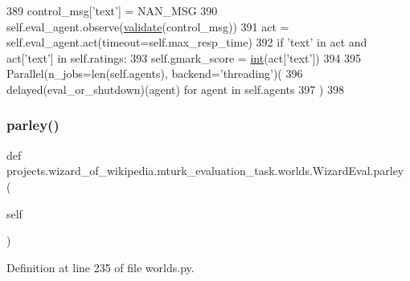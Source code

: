 \begin{DoxyCode}
389                     control\_msg[\textcolor{stringliteral}{'text'}] = NAN\_MSG
390                     self.eval\_agent.observe(\hyperlink{namespaceparlai_1_1core_1_1worlds_afc3fad603b7bce41dbdc9cdc04a9c794}{validate}(control\_msg))
391                     act = self.eval\_agent.act(timeout=self.max\_resp\_time)
392                 \textcolor{keywordflow}{if} \textcolor{stringliteral}{'text'} \textcolor{keywordflow}{in} act \textcolor{keywordflow}{and} act[\textcolor{stringliteral}{'text'}] \textcolor{keywordflow}{in} self.ratings:
393                     self.gmark\_score = \hyperlink{namespacelanguage__model_1_1eval__ppl_a7d12ee00479673c5c8d1f6d01faa272a}{int}(act[\textcolor{stringliteral}{'text'}])
394 
395         Parallel(n\_jobs=len(self.agents), backend=\textcolor{stringliteral}{'threading'})(
396             delayed(eval\_or\_shutdown)(agent) \textcolor{keywordflow}{for} agent \textcolor{keywordflow}{in} self.agents
397         )
398 
\end{DoxyCode}
\mbox{\label{classprojects_1_1wizard__of__wikipedia_1_1mturk__evaluation__task_1_1worlds_1_1WizardEval_abfff1c20503e898e721969580c160f67}} 
\subsubsection{\texorpdfstring{parley()}{parley()}}
{\footnotesize\ttfamily def projects.\+wizard\+\_\+of\+\_\+wikipedia.\+mturk\+\_\+evaluation\+\_\+task.\+worlds.\+Wizard\+Eval.\+parley (\begin{DoxyParamCaption}\item[{}]{self }\end{DoxyParamCaption})}



Definition at line 235 of file worlds.\+py.


